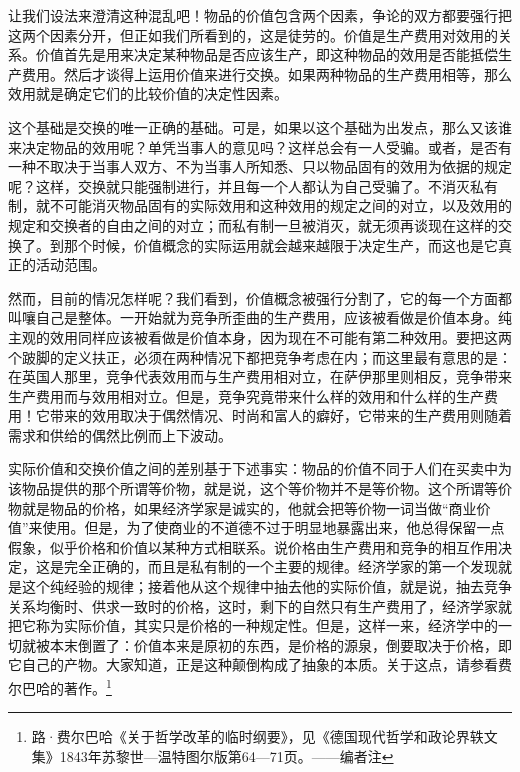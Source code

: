 \documentclass[a4paper,twoside,12pt,AutoFakeBold]{ctexart}
\begin{document}
让我们设法来澄清这种混乱吧！物品的价值包含两个因素，争论的双方都要强行把这两个因素分开，但正如我们所看到的，这是徒劳的。价值是生产费用对效用的关系。价值首先是用来决定某种物品是否应该生产，即这种物品的效用是否能抵偿生产费用。然后才谈得上运用价值来进行交换。如果两种物品的生产费用相等，那么效用就是确定它们的比较价值的决定性因素。

这个基础是交换的唯一正确的基础。可是，如果以这个基础为出发点，那么又该谁来决定物品的效用呢？单凭当事人的意见吗？这样总会有一人受骗。或者，是否有一种不取决于当事人双方、不为当事人所知悉、只以物品固有的效用为依据的规定呢？这样，交换就只能强制进行，并且每一个人都认为自己受骗了。不消灭私有制，就不可能消灭物品固有的实际效用和这种效用的规定之间的对立，以及效用的规定和交换者的自由之间的对立；而私有制一旦被消灭，就无须再谈现在这样的交换了。到那个时候，价值概念的实际运用就会越来越限于决定生产，而这也是它真正的活动范围。

然而，目前的情况怎样呢？我们看到，价值概念被强行分割了，它的每一个方面都叫嚷自己是整体。一开始就为竞争所歪曲的生产费用，应该被看做是价值本身。纯主观的效用同样应该被看做是价值本身，因为现在不可能有第二种效用。要把这两个跛脚的定义扶正，必须在两种情况下都把竞争考虑在内；而这里最有意思的是：在英国人那里，竞争代表效用而与生产费用相对立，在萨伊那里则相反，竞争带来生产费用而与效用相对立。但是，竞争究竟带来什么样的效用和什么样的生产费用！它带来的效用取决于偶然情况、时尚和富人的癖好，它带来的生产费用则随着需求和供给的偶然比例而上下波动。

实际价值和交换价值之间的差别基于下述事实：物品的价值不同于人们在买卖中为该物品提供的那个所谓等价物，就是说，这个等价物并不是等价物。这个所谓等价物就是物品的价格，如果经济学家是诚实的，他就会把等价物一词当做“商业价值”来使用。但是，为了使商业的不道德不过于明显地暴露出来，他总得保留一点假象，似乎价格和价值以某种方式相联系。说价格由生产费用和竞争的相互作用决定，这是完全正确的，而且是私有制的一个主要的规律。经济学家的第一个发现就是这个纯经验的规律；接着他从这个规律中抽去他的实际价值，就是说，抽去竞争关系均衡时、供求一致时的价格，这时，剩下的自然只有生产费用了，经济学家就把它称为实际价值，其实只是价格的一种规定性。但是，这样一来，经济学中的一切就被本末倒置了：价值本来是原初的东西，是价格的源泉，倒要取决于价格，即它自己的产物。大家知道，正是这种颠倒构成了抽象的本质。关于这点，请参看费尔巴哈的著作。\footnote{路·费尔巴哈《关于哲学改革的临时纲要》，见《德国现代哲学和政论界轶文集》1843年苏黎世—温特图尔版第64—71页。——编者注}
\end{document}
